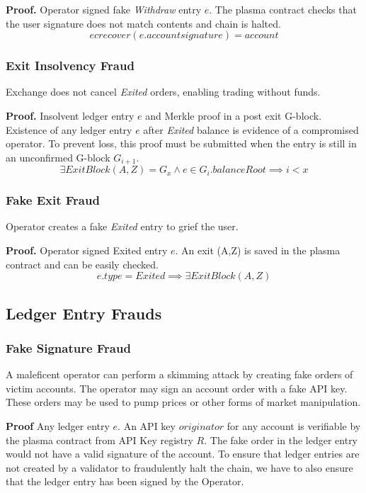 \documentclass[12pt,a4paper]{article}
\begin{document}
\textbf{Proof.} Operator signed fake \emph{Withdraw} entry $e$. The plasma contract checks that the user signature does not match contents and chain is halted.
\begin{equation}
ecrecover(e.accountsignature) = account
\end{equation}


\subsubsection{Exit Insolvency Fraud}\label{fp:eif}
Exchange does not cancel \emph{Exited} orders, enabling trading without funds.

\textbf{Proof.} Insolvent ledger entry $e$ and Merkle proof in a post exit G-block. Existence of any ledger entry $e$ after \emph{Exited} balance is evidence of a compromised operator. To prevent loss, this proof must be submitted when the entry is still in an unconfirmed G-block $G_{i+1}$.
\begin{equation}
\exists ExitBlock(A,Z) = G_x \wedge e \in G_{i}.balanceRoot \implies i < x
\end{equation}

\subsubsection{Fake Exit Fraud}\label{fp:fef}
Operator creates a fake \emph{Exited} entry to grief the user.

\textbf{Proof.} Operator signed Exited entry $e$. An exit (A,Z) is saved in the plasma contract and can be easily checked.
\begin{equation}
    e.type=Exited \implies \exists ExitBlock(A,Z)
\end{equation}

\subsection{Ledger Entry Frauds}
\subsubsection{Fake Signature Fraud} \label{fp:fsf}
A maleficent operator can perform a skimming attack by creating fake orders of victim accounts. The operator may sign an account order with a fake API key\cite{levzkapi}. These orders may be used to pump prices or other forms of market manipulation.

\textbf{Proof} 
Any ledger entry $e$. An API key $originator$ for any account is verifiable by the plasma contract from API Key registry $R$. The fake order in the ledger entry would not have a valid signature of the account. To ensure that ledger entries are not created by a validator to fraudulently halt the chain, we have to also ensure that the ledger entry has been signed by the Operator.
\end{document}
